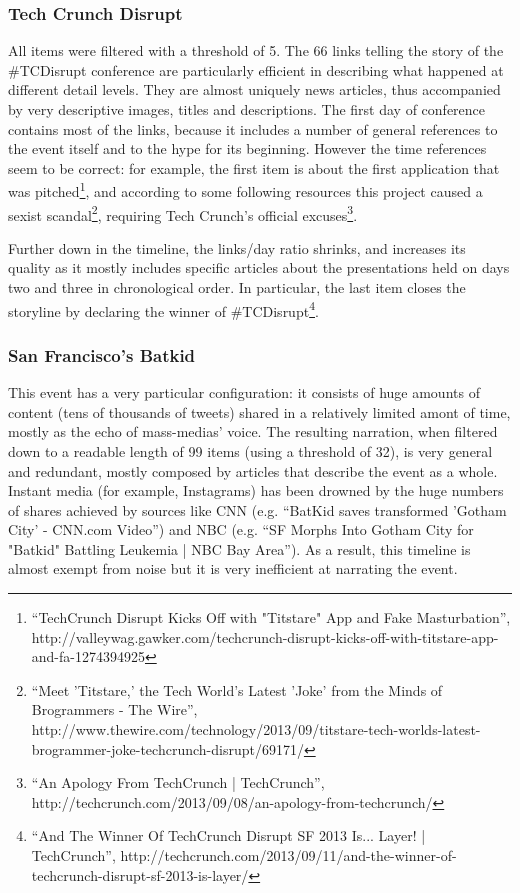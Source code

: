 \documentclass{sig-alternate}
\begin{document}
\subsubsection{Tech Crunch Disrupt}
All items were filtered with a threshold of 5. The 66 links telling the story of the \#TCDisrupt conference are particularly efficient in describing what happened at different detail levels. They are almost uniquely news articles, thus accompanied by very descriptive images, titles and descriptions. The first day of conference contains most of the links, because it includes a number of general references to the event itself and to the hype for its beginning. However the time references seem to be correct: for example, the first item is about the first application that was pitched\footnote{``TechCrunch Disrupt Kicks Off with "Titstare" App and Fake Masturbation'', http://valleywag.gawker.com/techcrunch-disrupt-kicks-off-with-titstare-app-and-fa-1274394925}, and according to some following resources this project caused a sexist scandal\footnote{``Meet 'Titstare,' the Tech World's Latest 'Joke' from the Minds of Brogrammers - The Wire'', http://www.thewire.com/technology/2013/09/titstare-tech-worlds-latest-brogrammer-joke-techcrunch-disrupt/69171/}, requiring Tech Crunch's official excuses\footnote{``An Apology From TechCrunch | TechCrunch'', http://techcrunch.com/2013/09/08/an-apology-from-techcrunch/}.

Further down in the timeline, the links/day ratio shrinks, and increases its quality as it mostly includes specific articles about the presentations held on days two and three in chronological order. In particular, the last item closes the storyline by declaring the winner of \#TCDisrupt\footnote{``And The Winner Of TechCrunch Disrupt SF 2013 Is... Layer! | TechCrunch'', http://techcrunch.com/2013/09/11/and-the-winner-of-techcrunch-disrupt-sf-2013-is-layer/}.

\subsubsection{San Francisco's Batkid}
This event has a very particular configuration: it consists of huge amounts of content (tens of thousands of tweets) shared in a relatively limited amont of time, mostly as the echo of mass-medias' voice. The resulting narration, when filtered down to a readable length of 99 items (using a threshold of 32), is very general and redundant, mostly composed by articles that describe the event as a whole. Instant media (for example, Instagrams) has been drowned by the huge numbers of shares achieved by sources like CNN (e.g. ``BatKid saves transformed 'Gotham City' - CNN.com Video'') and NBC (e.g. ``SF Morphs Into Gotham City for "Batkid" Battling Leukemia | NBC Bay Area''). As a result, this timeline is almost exempt from noise but it is very inefficient at narrating the event.
\end{document}
